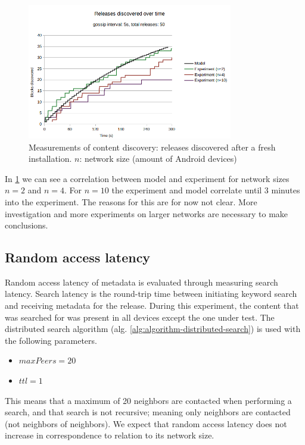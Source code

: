 \begin{figure}
    \centering
    \includegraphics[width=0.8\textwidth]{evaluation/expected-vs-simulated-releases.png}
    \caption{Measurements of content discovery: releases discovered after a fresh installation. $n$: network size (amount of Android devices)}
    \label{fig:content-discovery}
\end{figure}

In \ref{fig:content-discovery} we can see a correlation between model and experiment for network sizes $n=2$ and $n=4$. For $n=10$ the experiment and model correlate until 3 minutes into the experiment. The reasons for this are for now not clear. More investigation and more experiments on larger networks are necessary to make conclusions.

\subsection{Random access latency}
Random access latency of metadata is evaluated through measuring search latency. Search latency is the round-trip time between initiating keyword search and receiving metadata for the release. During this experiment, the content that was searched for was present in all devices except the one under test. The distributed search algorithm (alg. \ref{alg:algorithm-distributed-search}) is used with the following parameters.

\begin{itemize}
    \item $maxPeers=20$
    \item $ttl=1$ 
\end{itemize}

This means that a maximum of 20 neighbors are contacted when performing a search, and that search is not recursive; meaning only neighbors are contacted (not neighbors of neighbors). We expect that random access latency does not increase in correspondence to relation to its network size.

